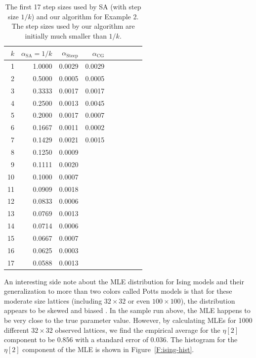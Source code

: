 \begin{table}
\caption[Comparisons of step sizes for SA and our algorithm for Ising model example]{The first 17 step sizes used by SA (with step size $1/k$) and our algorithm 
for Example 2.  The step sizes 
used by our algorithm are initially much smaller than $1/k$.}
\begin{center}
\begin{tabular}{rrrrrrrrr}
  \hline
  $k$ & $\alpha_{\textrm{SA}} =1/k$  & $\alpha_{\textrm{Steep}}$ & $\alpha_{\textrm
{CG}}$ \\ 
  \hline
1	&	1.0000	&	0.0029	&	0.0029	\\
2	&	0.5000	&	0.0005	&	0.0005	\\
3	&	0.3333	&	0.0017	&	0.0017	\\
4	&	0.2500	&	0.0013	&	0.0045	\\
5	&	0.2000	&	0.0017	&	0.0007	\\
6	&	0.1667	&	0.0011	&	0.0002	\\
7	&	0.1429	&	0.0021	&	0.0015	\\
8	&	0.1250	&	0.0009	&		\\
9	&	0.1111	&	0.0020	&		\\
10	&	0.1000	&	0.0007	&		\\
11	&	0.0909	&	0.0018	&		\\
12	&	0.0833	&	0.0006	&		\\
13	&	0.0769	&	0.0013	&		\\
14	&	0.0714	&	0.0006	&		\\
15	&	0.0667	&	0.0007	&		\\
16	&	0.0625	&	0.0003	&		\\
17	&	0.0588	&	0.0013	&		\\
  \hline
\end{tabular}
\end{center}
\label{Table:Potts step size}
\end{table}

An interesting side note about the MLE distribution for Ising models
and their generalization to 
more than two colors called Potts models is that for these moderate size lattices (including
$32 \times 32$ or even $100 \times 100$), the distribution appears to be skewed and 
biased \citep{Composite}.  In the sample run above, the MLE happens to be very close 
to the true parameter value.  However, by calculating MLEs for 1000 different $32 \times 32$
observed lattices, we find the empirical average for the $\eta[2]$ component to be $0.856$ with a
standard error of 0.036.  The histogram for the $\eta[2]$ component of the MLE 
is shown in Figure~\ref{F:ising-hist}. 

